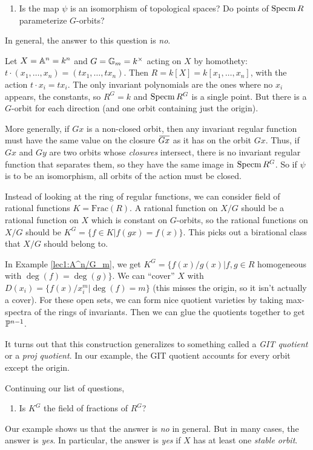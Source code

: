 \begin{enumerate}[resume]
 \item Is the map $\psi$ is an isomorphism of topological spaces? Do points of $\specm R$ parameterize $G$-orbits?
\end{enumerate}
In general, the answer to this question is \emph{no}.
\begin{example}\label{lec1:A^n/G_m}
 Let $X=\AA^n=k^n$ and $G=\GG_m=k^\times$ acting on $X$ by homothety: $t\cdot (x_1,\dots, x_n)=(tx_1,\dots, tx_n)$. Then $R=k[X]=k[x_1,\dots, x_n]$, with the action $t\cdot x_i=tx_i$. The only invariant polynomials are the ones where no $x_i$ appears, the constants, so $R^G=k$ and $\specm R^G$ is a single point. But there is a $G$-orbit for each direction (and one orbit containing just the origin).
\end{example}
More generally, if $G x$ is a non-closed orbit, then any invariant regular function must have the same value on the closure $\bbar{Gx}$ as it has on the orbit $Gx$. Thus, if $Gx$
and $Gy$ are two orbits whose \emph{closures} intersect, there is no invariant regular function that separates them, so they have the same image in $\specm R^G$. So if $\psi$ is to be an isomorphism, all orbits of the action must be closed.


Instead of looking at the ring of regular functions, we can consider field of rational functions $K=\mathrm{Frac}(R)$. A rational function on $X/G$ should be a rational function on $X$ which is constant on $G$-orbits, so the rational functions on $X/G$ should be $K^G=\{f\in K|f(gx)=f(x)\}$. This picks out a birational class that $X/G$ should belong to.

\begin{example}
 In Example \ref{lec1:A^n/G_m}, we get $K^G=\{f(x)/g(x)|f,g\in R$ homogeneous with $\deg(f)=\deg(g)\}$. We can ``cover'' $X$ with $D(x_i)=\{f(x)/x_i^m|\deg(f)=m\}$ (this misses the origin, so it isn't actually a cover). For these open sets, we can form nice quotient varieties by taking max-spectra of the rings of invariants. Then we can glue the quotients together to get $\PP^{n-1}$.
\end{example}
It turns out that this construction generalizes to something called a \emph{GIT quotient} or a \emph{proj quotient}. In our example, the GIT quotient accounts for every orbit except the origin.

Continuing our list of questions,
\begin{enumerate}[resume]
 \item Is $K^G$ the field of fractions of $R^G$?
\end{enumerate}
Our example shows us that the answer is \emph{no} in general. But in many cases, the answer is \emph{yes}. In particular, the answer is \emph{yes} if $X$ has at least one \emph{stable orbit}.

